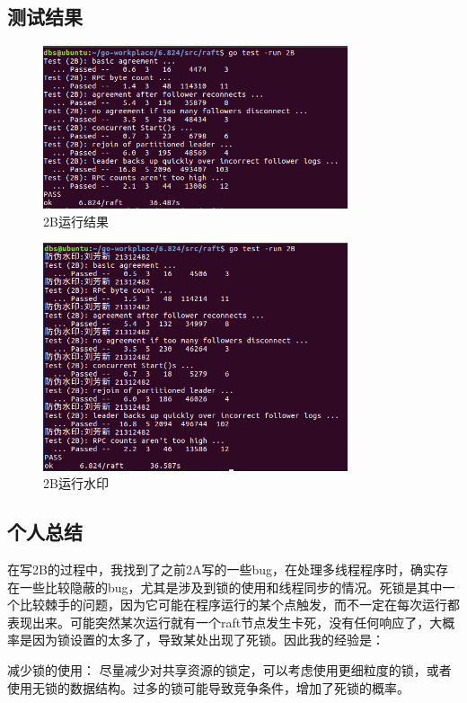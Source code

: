 \documentclass[]{article}
\begin{document}
	\subsection{测试结果}
	\begin{figure}[H]
		\centering
		\includegraphics[width=0.8\textwidth]{./2B/2B result.png}
		\caption{2B运行结果}
	\end{figure}
	\begin{figure}[H]
		\centering
		\includegraphics[width=0.8\textwidth]{./2B/2B result1.png}
		\caption{2B运行水印}
	\end{figure}
	
	\subsection{个人总结}
	在写2B的过程中，我找到了之前2A写的一些bug，在处理多线程程序时，确实存在一些比较隐蔽的bug，尤其是涉及到锁的使用和线程同步的情况。死锁是其中一个比较棘手的问题，因为它可能在程序运行的某个点触发，而不一定在每次运行都表现出来。可能突然某次运行就有一个raft节点发生卡死，没有任何响应了，大概率是因为锁设置的太多了，导致某处出现了死锁。因此我的经验是：
	
	减少锁的使用： 尽量减少对共享资源的锁定，可以考虑使用更细粒度的锁，或者使用无锁的数据结构。过多的锁可能导致竞争条件，增加了死锁的概率。
	
\end{document}
